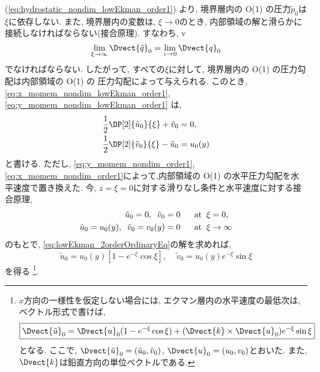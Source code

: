 (\ref{eq:hydrostatic_nondim_lowEkman_order1}) より, 
境界層内の O(1) の圧力$\tilde{p}_0$は$\xi$に依存しない. 
また, 境界層内の変数は, $\xi \to 0$のとき, 内部領域の解と滑らかに接続しなければならない(接合原理). 
すなわち, 
v\begin{equation}
 \lim_{\xi \to \infty} \Dvect{\tilde{q}}_0
 =  \lim_{z \to 0} \Dvect{q}_0
\end{equation} 
でなければならない. 
したがって, すべての$\xi$に対して, 境界層内の O(1) の圧力勾配は内部領域の O(1) の
圧力勾配によって与えられる. 
このとき, \eqref{eq:x_momem_nondim_lowEkman_order1}, \eqref{eq:y_momem_nondim_lowEkman_order1} は, 
\begin{equation}
\begin{split}
  \dfrac{1}{2}\DP[2]{\tilde{u}_0}{\xi}  + \tilde{v}_0 &= 0, \\
  \dfrac{1}{2}\DP[2]{\tilde{v}_0}{\xi}  - \tilde{u}_0 &= u_0(y)
\end{split}
\label{eq:lowEkman_2orderOrdinaryEq}
\end{equation}
と書ける. 
ただし, \eqref{eq:y_momem_nondim_order1}, \eqref{eq:x_momem_nondim_order1}によって,内部領域の O(1) の水平圧力勾配を水平速度で置き換えた. 
今, $z=\xi=0$に対する滑りなし条件と水平速度に対する接合原理, 
\begin{equation}
\begin{split}
  \tilde{u}_0 = 0, \;\; \tilde{v}_0 = 0 \;\;\;\;\;\; &{\rm at} \;\; \xi = 0, \\
  \tilde{u}_0 = u_0(y), \;\; \tilde{v}_0 = v_0(y)=0 \;\;\;\;\;\; &{\rm at} \;\; \xi \to \infty 
\end{split}
\end{equation}
のもとで, 
\eqref{eq:lowEkman_2orderOrdinaryEq}の解を求めれば, 
\begin{equation}
\boxed{
  \tilde{u}_0 = u_0(y) \left[1 - e^{-\xi}\cos{\xi} \right], \;\;\;\;
  \tilde{v}_0 = u_0(y) e^{-\xi} \sin{\xi}  
}
\label{eq:EkmanSol_hVel_order1}
\end{equation}
を得る%
\footnote{
$x$方向の一様性を仮定しない場合には, エクマン層内の水平速度の最低次は, 
ベクトル形式で書けば, 
\begin{equation*}
\boxed{
  \Dvect{\tilde{u}}_0 = \Dvect{u}_0 (1 - e^{-\xi} \cos{\xi})
         + (\Dvect{k} \times \Dvect{u}_0) e^{-\xi} \sin{\xi}
}
\end{equation*} 
となる. 
ここで, $\Dvect{\tilde{u}}_0=(\tilde{u}_0, \tilde{v}_0)$, $\Dvect{u}_0=(u_0, v_0)$とおいた.  
また, $\Dvect{k}$は鉛直方向の単位ベクトルである. 
}.

